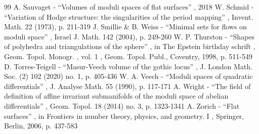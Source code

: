 \documentclass[11pt]{article}
\numberwithin{equation}{section}
\theoremstyle{plain}
\theoremstyle{definition}
\begin{document}
\begin{thebibliography}{99}
 A. Sauvaget - “Volumes of moduli spaces of flat surfaces” , 2018
 W. Schmid - “Variation of Hodge structure: the singularities of the period mapping” , Invent. Math. 22 (1973), p. 211-319
 J. Smillie \& B. Weiss - “Minimal sets for flows on moduli space” , Israel J. Math. 142 (2004), p. 249-260
 W. P. Thurston - “Shapes of polyhedra and triangulations of the sphere” , in The Epstein birthday schrift , Geom. Topol. Monogr. , vol. 1 , Geom. Topol. Publ., Coventry, 1998, p. 511-549
 D. Torres-Teigell - “Masur-Veech volume of the gothic locus” , J. London Math. Soc. (2) 102 (2020) no. 1, p. 405-436
 W. A. Veech - “Moduli spaces of quadratic differentials” , J. Analyse Math. 55 (1990), p. 117-171
 A. Wright - “The field of definition of affine invariant submanifolds of the moduli space of abelian differentials” , Geom. Topol. 18 (2014) no. 3, p. 1323-1341
 A. Zorich - “Flat surfaces” , in Frontiers in number theory, physics, and geometry. I , Springer, Berlin, 2006, p. 437-583
\end{thebibliography}
\end{document}
